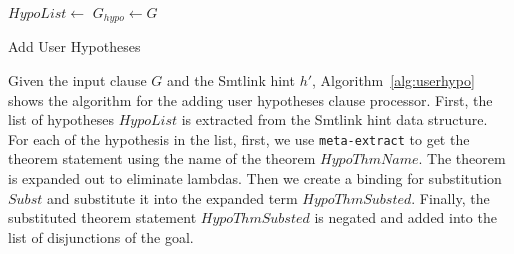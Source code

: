 \begin{algorithm}[!ht]
  \DontPrintSemicolon
  


  
  \;
  $HypoList \longleftarrow $\;
  $G_{hypo} \longleftarrow G$\;
  \;
  \;

  \caption{Add User Hypotheses}\label{alg:userhypo}
\end{algorithm}

Given the input clause $G$ and the Smtlink hint $h'$,
Algorithm~\ref{alg:userhypo} shows the algorithm for the adding user hypotheses
clause processor. First, the list of hypotheses $HypoList$ is extracted from the
Smtlink hint data structure. For each of the hypothesis in the list, first, we
use \texttt{meta-extract} to get the theorem statement using the name of the
theorem $HypoThmName$. The theorem is expanded out to eliminate lambdas. Then we
create a binding for substitution $Subst$ and substitute it into the expanded
term $HypoThmSubsted$. Finally, the substituted theorem statement
$HypoThmSubsted$ is negated and added into the list of disjunctions of the goal.

